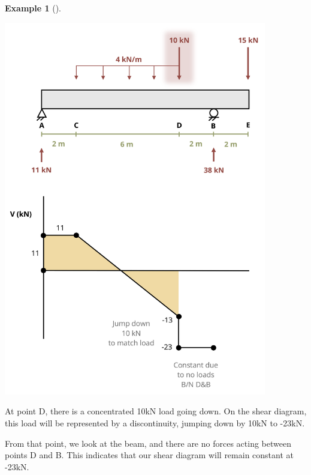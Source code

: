 \documentclass[
  letterpaper,
  DIV=11,
  numbers=noendperiod]{scrreprt}
\theoremstyle{definition}
\newtheorem{example}{Example}[chapter]
\theoremstyle{remark}
\begin{document}
\begin{tcolorbox}
\begin{example}[]
\begin{tcolorbox}
\begin{center}
\includegraphics[width=4.52083in,height=\textheight]{images/CH7 PNGs/example 7.3 part 5.png}
\end{center}

At point D, there is a concentrated 10kN load going down. On the shear
diagram, this load will be represented by a discontinuity, jumping down
by 10kN to -23kN.

From that point, we look at the beam, and there are no forces acting
between points D and B. This indicates that our shear diagram will
remain constant at -23kN.


\end{tcolorbox}
\end{example}
\end{tcolorbox}
\end{document}
